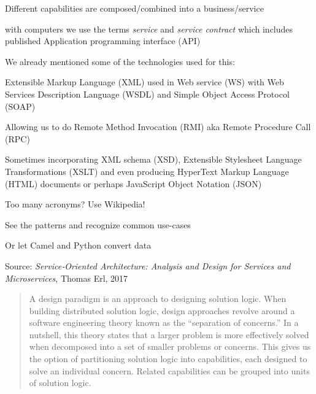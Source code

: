 \documentclass[Screen16to9,17pt]{foils}
\begin{document}
\begin{list2}
\item Different capabilities are composed/combined into a business/service
\item with computers we use the terms \emph{service} and \emph{service contract} which includes published Application programming interface (API)
\end{list2}




We already mentioned some of the technologies used for this:
\begin{list2}
\item Extensible Markup Language (XML) used in Web service (WS) with Web Services Description Language (WSDL) and Simple Object Access Protocol (SOAP)
\item Allowing us to do Remote Method Invocation (RMI) aka Remote Procedure Call (RPC)
\item Sometimes incorporating XML schema (XSD), Extensible Stylesheet Language Transformations (XSLT) and even producing HyperText Markup Language (HTML) documents or perhaps JavaScript Object Notation (JSON)
\item Too many acronyms? Use Wikipedia!
\item See the patterns and recognize common use-cases
\item Or let Camel and Python convert data \smiley
\end{list2}


Source: \emph{Service‑Oriented Architecture: Analysis and Design for Services and Microservices}, Thomas Erl, 2017




\begin{quote}
A design paradigm is an approach to designing solution logic. When building distributed solution logic, design approaches revolve around a software engineering theory known as the “separation of concerns.” In a nutshell, this theory states that a larger problem is more effectively solved when decomposed into a set of smaller problems or concerns. This gives us the option of partitioning solution logic into capabilities, each designed to solve an individual concern. Related capabilities can be grouped into units of solution logic.
\end{quote}
\end{document}
